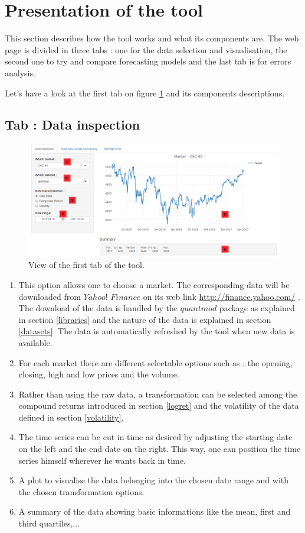 \documentclass[11pt,a4paper,oneside]{book}
\begin{document}
\section{Presentation of the tool}

This section describes how the tool works and what its components are. The web page is divided in three tabs : one for the data selection and visualisation, the second one to try and compare forecasting models and the last tab is for errors analysis. 

Let's have a look at the first tab on figure \ref{fig:tool1} and its components descriptions.

\subsection{Tab : Data inspection}


\begin{figure}[!h]
  \centering
    \includegraphics[scale=0.44]{img/tab1.png}
  \caption{View of the first tab of the tool.}
  \label{fig:tool1}
\end{figure}


\begin{enumerate}
\item This option allows one to choose a market. The corresponding data will be downloaded from $Yahoo!$ $Finance$ on its web link \url{http://finance.yahoo.com/} \cite{yahoo}. The download of the data is handled by the $quantmod$ package as explained in section \ref{libraries} and the nature of the data is explained in section \ref{datasets}. The data is automatically refreshed by the tool when new data is available.
\item For each market there are different selectable options such as : the opening, closing, high and low prices and the volume.
\item Rather than using the raw data, a transformation can be selected among the compound returns introduced in section \ref{logret} and the volatility of the data defined in section \ref{volatility}.
\item The time series can be cut in time as desired by adjusting the starting date on the left and the end date on the right. This way, one can position the time series himself wherever he wants back in time.
\item A plot to visualise the data belonging into the chosen date range and with the chosen transformation options.
\item A summary of the data showing basic informations like the mean, first and third quartiles,...
\end{enumerate}
\end{document}
